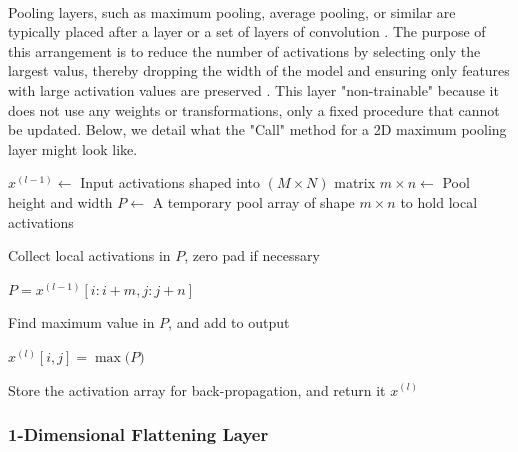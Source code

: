 \documentclass[12pt,letterpaper]{article}
\begin{document}
\paragraph*{}Pooling layers, such as maximum pooling, average pooling, or similar are typically placed after a layer or a set of layers of convolution \cite{Loy}. The purpose of this arrangement is to reduce the number of activations by selecting only the largest valus, thereby dropping the width of the model and ensuring only features with large activation values are preserved \cite{Geron,Loy,Goodfellow}. This layer "non-trainable" because it does not use any weights or transformations, only a fixed procedure that cannot be updated. Below, we detail what the "Call" method for a 2D maximum pooling layer might look like.

\begin{algorithm}[H]
\caption{Typical "Call" method for a 2-Dimensional Maximum Pooling layer in a neural network. We assume 2D input, but a practical implementation may include the need to loop over a high dimensional structure. For simplicity, we assume a stride size of $1 \times 1$. This example shows the computation over a single input $x^{(l-1)}$ but a practical implementation should include mini-batches of samples.}
\label{alg-CallPool2D}

\begin{algorithmic}
\REQUIRE $x^{(l-1)} \leftarrow$ Input activations shaped into $(M \times N)$ matrix
\REQUIRE $m \times n \leftarrow$ Pool height and width
\REQUIRE $P \leftarrow$ A temporary pool array of shape $m \times n $ to hold local activations

\FOR {$i \in [0,1,...,M-2,M-1$}
	\FOR {$j \in [0,1,...,N-2,N-1$}
		\item Collect local activations in $P$, zero pad if necessary
		\item $P = x^{(l-1)}[i:i+m,j:j+n]$
		\item Find maximum value in $P$, and add to output
		\item $x^{(l)}[i,j] = \max\big( P \big)$
	\ENDFOR
\ENDFOR

Store the activation array for back-propagation, and return it
\RETURN $x^{(l)}$

\end{algorithmic}
\end{algorithm}


\subsubsection{1-Dimensional Flattening Layer}
\label{subsubsec-1DFlatten}
\end{document}
